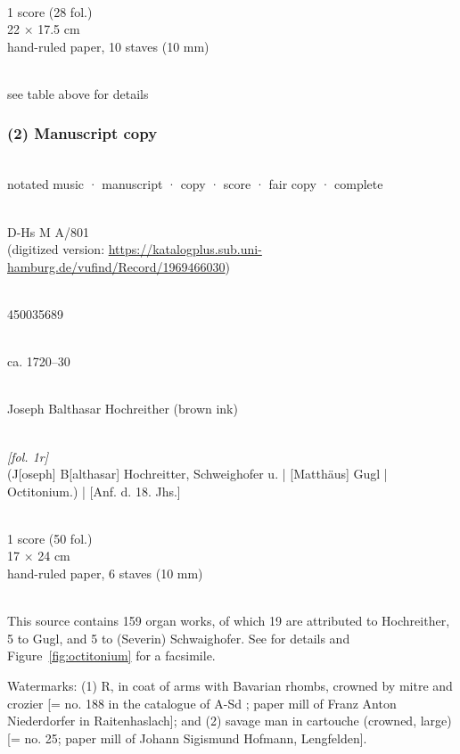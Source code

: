 \documentclass[abbrwidth=7em,shorttitlesize=55]{ees}
\begin{document}
\\
1 score (28 fol.)\\
22 × 17.5 cm\\
hand-ruled paper, 10 staves (10 mm)

\\[1ex]
see table above for details


\subsubsection{(2) Manuscript copy}

\\
notated music · manuscript · copy · score · fair copy · complete

\\
D-Hs M A/801\\
(digitized version: \url{https://katalogplus.sub.uni-hamburg.de/vufind/Record/1969466030})

\\
450035689

\\
ca. 1720–30

\\
Joseph Balthasar Hochreither (brown ink)

\\
\textit{[fol. 1r]}\\ (J[oseph] B[althasar] Hochreitter, Schweighofer u. | [Matthäus] Gugl | Octitonium.) | [Anf. d. 18. Jhs.]

\pagebreak
{}\\
1 score (50 fol.)\\
17 × 24 cm\\
hand-ruled paper, 6 staves (10 mm)

\\[1ex]
This source contains 159 organ works, of which 19 are attributed to Hochreither, 5 to Gugl, and 5 to (Severin) Schwaighofer. See \textcite{EsserSkala2026} for details and Figure~\ref{fig:octitonium} for a facsimile.

Watermarks: (1) R, in coat of arms with Bavarian rhombs, crowned by mitre and crozier [= no. 188 in the catalogue of A-Sd \parencite{Neumayr2018}; paper mill of Franz Anton Niederdorfer in Raitenhaslach]; and (2) savage man in cartouche (crowned, large) [= no. 25; paper mill of Johann Sigismund Hofmann, Lengfelden].
\end{document}
